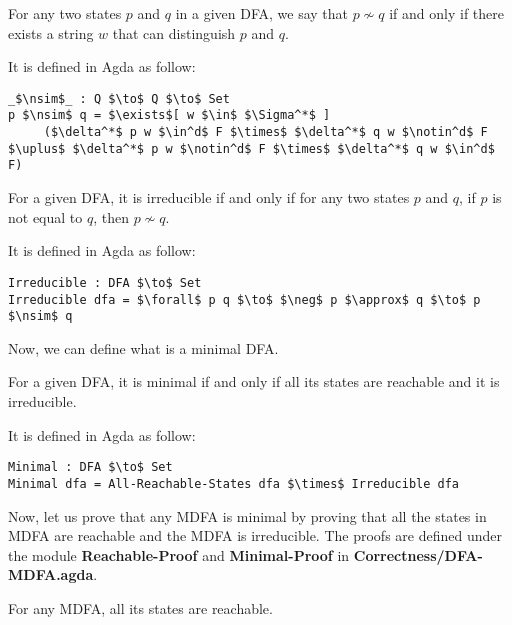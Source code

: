 \begin{defn}
\noindent For any two states \(p\) and \(q\) in a given DFA, we say that \(p \nsim
q\) if and only if there exists a string \(w\) that can distinguish
\(p\) and \(q\). 
\end{defn}

\par It is defined in Agda as follow:
\begin{lstlisting}[mathescape=true,xleftmargin=.3\textwidth]
_$\nsim$_ : Q $\to$ Q $\to$ Set
p $\nsim$ q = $\exists$[ w $\in$ $\Sigma^*$ ] 
     ($\delta^*$ p w $\in^d$ F $\times$ $\delta^*$ q w $\notin^d$ F $\uplus$ $\delta^*$ p w $\notin^d$ F $\times$ $\delta^*$ q w $\in^d$ F)
\end{lstlisting}

\begin{defn}
\noindent For a given DFA, it is irreducible if and only if for any
two states \(p\) and \(q\), if \(p\) is not equal to \(q\), then \(p \nsim q\). 
\end{defn}

\par It is defined in Agda as follow:
\begin{lstlisting}[mathescape=true,xleftmargin=.3\textwidth]
Irreducible : DFA $\to$ Set
Irreducible dfa = $\forall$ p q $\to$ $\neg$ p $\approx$ q $\to$ p $\nsim$ q
\end{lstlisting}

\par Now, we can define what is a minimal DFA. 

\begin{defn}
\noindent For a given DFA, it is minimal if and only if all its states
are reachable and it is irreducible. 
\end{defn}

\par It is defined in Agda as follow:
\begin{lstlisting}[mathescape=true,xleftmargin=.3\textwidth]
Minimal : DFA $\to$ Set
Minimal dfa = All-Reachable-States dfa $\times$ Irreducible dfa
\end{lstlisting}

\par Now, let us prove that any MDFA is minimal by proving that all the states in MDFA are reachable and the MDFA
is irreducible. The proofs are defined under the module
\textbf{Reachable-Proof} and \textbf{Minimal-Proof} in
\textbf{Correctness/DFA-MDFA.agda}. 

\begin{thm}
\label{thm:all_reach}
\noindent For any MDFA, all its states are reachable. 
\end{thm}

